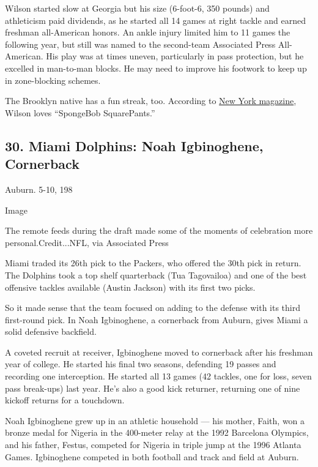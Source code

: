 Wilson started slow at Georgia but his size (6-foot-6, 350 pounds) and
athleticism paid dividends, as he started all 14 games at right tackle
and earned freshman all-American honors. An ankle injury limited him to
11 games the following year, but still was named to the second-team
Associated Press All-American. His play was at times uneven,
particularly in pass protection, but he excelled in man-to-man blocks.
He may need to improve his footwork to keep up in zone-blocking schemes.

The Brooklyn native has a fun streak, too. According to
\href{https://nymag.com/intelligencer/2016/12/reasons-to-love-new-york-2016.html}{New
York magazine}, Wilson loves ``SpongeBob SquarePants.''

\hypertarget{30-miami-dolphins-noah-igbinoghene-cornerback}{%
\subsection{30. Miami Dolphins: Noah Igbinoghene,
Cornerback}\label{30-miami-dolphins-noah-igbinoghene-cornerback}}

Auburn. 5-10, 198

Image

The remote feeds during the draft made some of the moments of
celebration more personal.Credit...NFL, via Associated Press

Miami traded its 26th pick to the Packers, who offered the 30th pick in
return. The Dolphins took a top shelf quarterback (Tua Tagovailoa) and
one of the best offensive tackles available (Austin Jackson) with its
first two picks.

So it made sense that the team focused on adding to the defense with its
third first-round pick. In Noah Igbinoghene, a cornerback from Auburn,
gives Miami a solid defensive backfield.

A coveted recruit at receiver, Igbinoghene moved to cornerback after his
freshman year of college. He started his final two seasons, defending 19
passes and recording one interception. He started all 13 games (42
tackles, one for loss, seven pass break-ups) last year. He's also a good
kick returner, returning one of nine kickoff returns for a touchdown.

Noah Igbinoghene grew up in an athletic household --- his mother, Faith,
won a bronze medal for Nigeria in the 400-meter relay at the 1992
Barcelona Olympics, and his father, Festus, competed for Nigeria in
triple jump at the 1996 Atlanta Games. Igbinoghene competed in both
football and track and field at Auburn.

